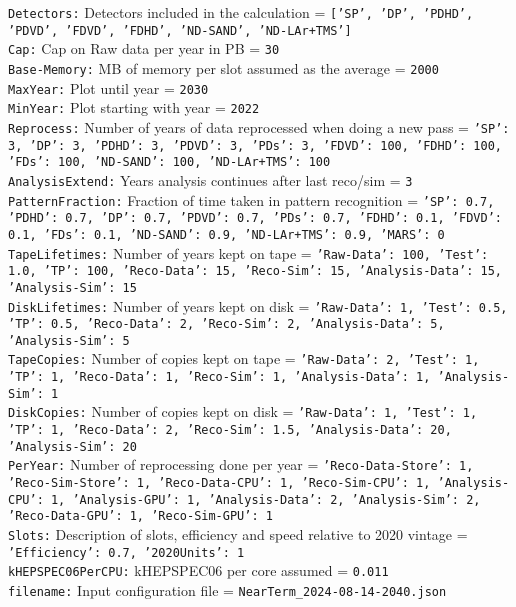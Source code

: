 {\tt Detectors:} Detectors included in the calculation = {\tt ['SP', 'DP', 'PDHD', 'PDVD', 'FDVD', 'FDHD', 'ND-SAND', 'ND-LAr+TMS']} \\
{\tt Cap:} Cap on Raw data per year in PB = {\tt 30} \\
{\tt Base-Memory:} MB of memory per slot assumed as the average = {\tt 2000} \\
{\tt MaxYear:} Plot until year = {\tt 2030} \\
{\tt MinYear:} Plot starting with year = {\tt 2022} \\
{\tt Reprocess:} Number of years of data reprocessed when doing a new pass = {\tt {'SP': 3, 'DP': 3, 'PDHD': 3, 'PDVD': 3, 'PDs': 3, 'FDVD': 100, 'FDHD': 100, 'FDs': 100, 'ND-SAND': 100, 'ND-LAr+TMS': 100}} \\
{\tt AnalysisExtend:} Years analysis continues after last reco/sim = {\tt 3} \\
{\tt PatternFraction:} Fraction of time taken in pattern recognition = {\tt {'SP': 0.7, 'PDHD': 0.7, 'DP': 0.7, 'PDVD': 0.7, 'PDs': 0.7, 'FDHD': 0.1, 'FDVD': 0.1, 'FDs': 0.1, 'ND-SAND': 0.9, 'ND-LAr+TMS': 0.9, 'MARS': 0}} \\
{\tt TapeLifetimes:} Number of years kept on tape = {\tt {'Raw-Data': 100, 'Test': 1.0, 'TP': 100, 'Reco-Data': 15, 'Reco-Sim': 15, 'Analysis-Data': 15, 'Analysis-Sim': 15}} \\
{\tt DiskLifetimes:} Number of years kept on disk = {\tt {'Raw-Data': 1, 'Test': 0.5, 'TP': 0.5, 'Reco-Data': 2, 'Reco-Sim': 2, 'Analysis-Data': 5, 'Analysis-Sim': 5}} \\
{\tt TapeCopies:} Number of copies kept on tape = {\tt {'Raw-Data': 2, 'Test': 1, 'TP': 1, 'Reco-Data': 1, 'Reco-Sim': 1, 'Analysis-Data': 1, 'Analysis-Sim': 1}} \\
{\tt DiskCopies:} Number of copies kept on disk = {\tt {'Raw-Data': 1, 'Test': 1, 'TP': 1, 'Reco-Data': 2, 'Reco-Sim': 1.5, 'Analysis-Data': 20, 'Analysis-Sim': 20}} \\
{\tt PerYear:} Number of reprocessing done per year = {\tt {'Reco-Data-Store': 1, 'Reco-Sim-Store': 1, 'Reco-Data-CPU': 1, 'Reco-Sim-CPU': 1, 'Analysis-CPU': 1, 'Analysis-GPU': 1, 'Analysis-Data': 2, 'Analysis-Sim': 2, 'Reco-Data-GPU': 1, 'Reco-Sim-GPU': 1}} \\
{\tt Slots:} Description of slots, efficiency and speed relative to 2020 vintage = {\tt {'Efficiency': 0.7, '2020Units': 1}} \\
{\tt kHEPSPEC06PerCPU:} kHEPSPEC06 per core assumed = {\tt 0.011} \\
{\tt filename:} Input configuration file = {\tt NearTerm\_2024-08-14-2040.json} \\
